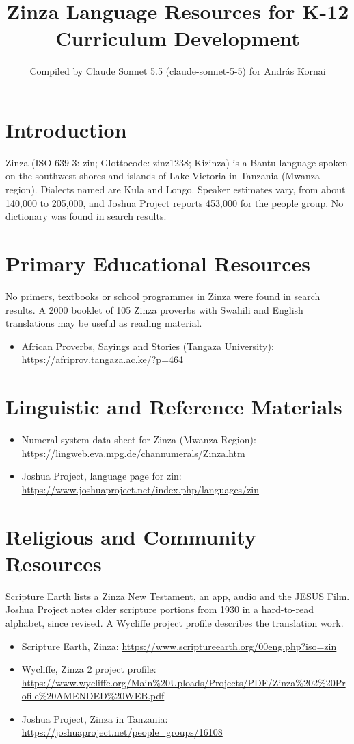 \documentclass[12pt]{article}
\title{Zinza Language Resources for K-12 Curriculum Development}
\author{Compiled by Claude Sonnet 5.5 (claude-sonnet-5-5) for Andr\'as Kornai}
\date{}
\begin{document}
\maketitle

\section{Introduction}
Zinza (ISO 639-3: zin; Glottocode: zinz1238; Kizinza) is a Bantu language spoken on the southwest shores and islands of Lake Victoria in Tanzania (Mwanza region). Dialects named are Kula and Longo. Speaker estimates vary, from about 140,000 to 205,000, and Joshua Project reports 453,000 for the people group. No dictionary was found in search results.

\section{Primary Educational Resources}
No primers, textbooks or school programmes in Zinza were found in search results. A 2000 booklet of 105 Zinza proverbs with Swahili and English translations may be useful as reading material.
\begin{itemize}
\item African Proverbs, Sayings and Stories (Tangaza University): \url{https://afriprov.tangaza.ac.ke/?p=464}
\end{itemize}

\section{Linguistic and Reference Materials}
\begin{itemize}
\item Numeral-system data sheet for Zinza (Mwanza Region): \url{https://lingweb.eva.mpg.de/channumerals/Zinza.htm}
\item Joshua Project, language page for zin: \url{https://www.joshuaproject.net/index.php/languages/zin}
\end{itemize}

\section{Religious and Community Resources}
Scripture Earth lists a Zinza New Testament, an app, audio and the JESUS Film. Joshua Project notes older scripture portions from 1930 in a hard-to-read alphabet, since revised. A Wycliffe project profile describes the translation work.
\begin{itemize}
\item Scripture Earth, Zinza: \url{https://www.scriptureearth.org/00eng.php?iso=zin}
\item Wycliffe, Zinza 2 project profile: \url{https://www.wycliffe.org/Main%20Uploads/Projects/PDF/Zinza%202%20Profile%20AMENDED%20WEB.pdf}
\item Joshua Project, Zinza in Tanzania: \url{https://joshuaproject.net/people_groups/16108}
\end{itemize}
\end{document}
